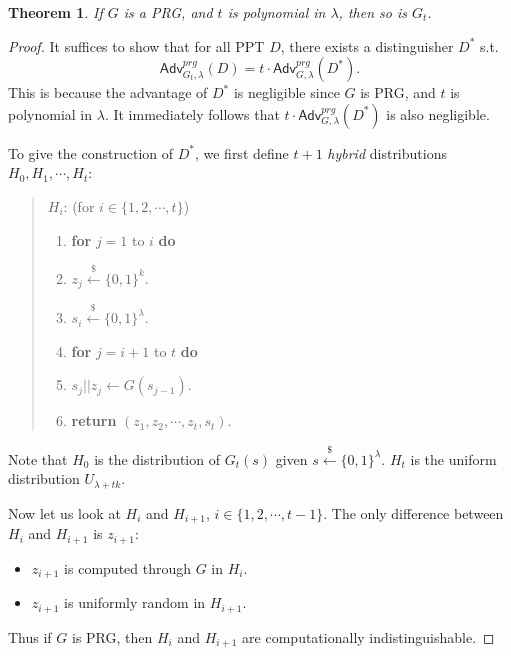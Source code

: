 \documentclass[12pt]{article}
\newcommand{\bits}{\{0,1\}}
\newcommand{\getsr}{\stackrel{\$}{\gets}}
\newcommand{\Adv}{\mathsf{Adv}}
\newcommand{\tab}{\hspace{0.3in}}
\newtheorem{theorem}{Theorem}[section]
\theoremstyle{definition}
\begin{document}
\begin{theorem}
If $G$ is a PRG, and $t$ is polynomial in $\lambda$, then so is $G_t$.
\end{theorem}
\begin{proof}
It suffices to show that for all PPT $D$, there exists a distinguisher $D^*$ s.t.
$$\Adv_{G_t,\lambda}^{prg}(D) = t\cdot \Adv_{G,\lambda}^{prg}(D^*).$$
This is because the advantage of $D^*$ is negligible since $G$ is PRG, and $t$ is polynomial in $\lambda$. It immediately follows that $t\cdot \Adv_{G,\lambda}^{prg}(D^*)$ is also negligible.

To give the construction of $D^*$, we first define $t+1$ \emph{hybrid} distributions $H_0, H_1, \cdots, H_t$:
\begin{quote}
$H_i$: (for $i \in \{1, 2, \cdots, t\}$)
\begin{enumerate}
\item {\bf for} $j=1$ to $i$ {\bf do}
\item \tab $z_j \getsr \bits^k$.
\item $s_i \getsr \bits^\lambda$.
\item {\bf for} $j=i+1$ to $t$ {\bf do}
\item \tab $s_j||z_j \gets G(s_{j-1})$.
\item {\bf return} $(z_1, z_2, \cdots, z_t, s_t)$.
\end{enumerate}
\end{quote}
Note that $H_0$ is the distribution of $G_t(s)$ given $s \getsr \bits^\lambda$. $H_t$ is the uniform distribution $U_{\lambda+tk}$.

Now let us look at $H_i$ and $H_{i+1}$, $i \in \{1, 2, \cdots, t-1\}$. The only difference between $H_i$ and $H_{i+1}$ is $z_{i+1}$:
\begin{itemize}
\item $z_{i+1}$ is computed through $G$ in $H_i$.
\item $z_{i+1}$ is uniformly random in $H_{i+1}$.
\end{itemize}
Thus if $G$ is PRG, then $H_i$ and $H_{i+1}$ are computationally indistinguishable.


\end{proof}
\end{document}
